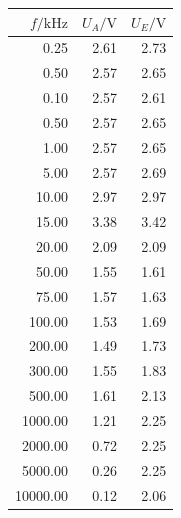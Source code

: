 \documentclass[]{scrartcl}
\begin{document}
\begin{table}[H]
	\centering
	\label{tab:ggverst_c}
	\hskip-1.50cm
	\begin{tabular}{r r r}
		\toprule
		$f / \si{\kilo\hertz}$ & $U_A/\si{\volt}$ & $U_E/\si{\volt}$ \\
		\midrule
		0.25	&	2.61	&	2.73 \\
		0.50	&	2.57	&	2.65 \\
		0.10	&	2.57	&	2.61 \\
		0.50	&	2.57	&	2.65 \\
		1.00	&	2.57	&	2.65 \\
		5.00	&	2.57	&	2.69 \\
		10.00	&	2.97	&	2.97 \\
		15.00	&	3.38	&	3.42 \\
		20.00	&	2.09	&	2.09 \\
		50.00	&	1.55	&	1.61 \\
		75.00	&	1.57	&	1.63 \\
		100.00	&	1.53	&	1.69 \\
		200.00	&	1.49	&	1.73 \\
		300.00	&	1.55	&	1.83 \\
		500.00	&	1.61	&	2.13 \\
		1000.00	&	1.21	&	2.25 \\
		2000.00	&	0.72	&	2.25 \\
		5000.00	&	0.26	&	2.25 \\
		10000.00	&	0.12	&	2.06 \\
		\bottomrule
	\end{tabular}
\end{table}
\end{document}

